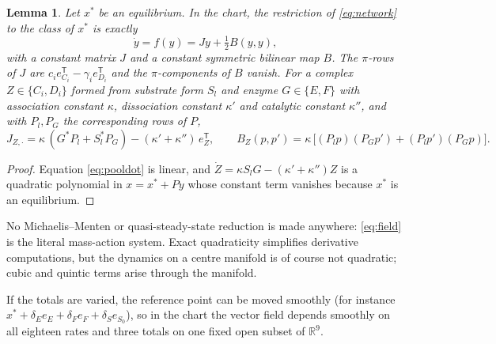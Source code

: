 \documentclass[11pt,a4paper]{article}
\theoremstyle{plain}
\newtheorem{lemma}[theorem]{Lemma}
\theoremstyle{definition}
\theoremstyle{remark}
\newcommand{\R}{\mathbb R}
\newcommand{\T}{\mathsf T}
\begin{document}
\begin{lemma}\label{lem:quadratic}
Let $x^*$ be an equilibrium. In the chart, the restriction of \eqref{eq:network} to the class of $x^*$ is exactly
\begin{equation}\label{eq:field}
\dot y=f(y)=Jy+\tfrac12B(y,y),
\end{equation}
with a constant matrix $J$ and a constant symmetric bilinear map $B$. The $\pi$-rows of $J$ are $c_ie_{C_i}^\T-\gamma_ie_{D_i}^\T$ and the $\pi$-components of $B$ vanish. For a complex $Z\in\{C_i,D_i\}$ formed from substrate form $S_{l}$ and enzyme $G\in\{E,F\}$ with association constant $\kappa$, dissociation constant $\kappa'$ and catalytic constant $\kappa''$, and with $P_l,P_G$ the corresponding rows of $P$,
\begin{equation}\label{eq:JB}
J_{Z,\cdot}=\kappa\,(G^*P_{l}+S_l^*P_{G})-(\kappa'+\kappa'')\,e_Z^\T,\qquad
B_Z(p,p')=\kappa\,\bigl[(P_lp)(P_Gp')+(P_lp')(P_Gp)\bigr].
\end{equation}
\end{lemma}
\begin{proof}
Equation \eqref{eq:pooldot} is linear, and $\dot Z=\kappa S_lG-(\kappa'+\kappa'')Z$ is a quadratic polynomial in $x=x^*+Py$ whose constant term vanishes because $x^*$ is an equilibrium.
\end{proof}

No Michaelis--Menten or quasi-steady-state reduction is made anywhere: \eqref{eq:field} is the literal mass-action system. Exact quadraticity simplifies derivative computations, but the dynamics on a centre manifold is of course not quadratic; cubic and quintic terms arise through the manifold.

If the totals are varied, the reference point can be moved smoothly (for instance $x^*+\delta_E e_E+\delta_Fe_F+\delta_Se_{S_0}$), so in the chart the vector field depends smoothly on all eighteen rates and three totals on one fixed open subset of $\R^9$.
\end{document}
